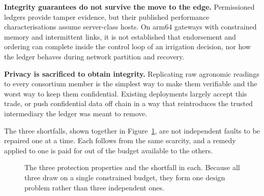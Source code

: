 \documentclass[12pt,a4paper,oneside]{book}
\begin{document}
\textbf{Integrity guarantees do not survive the move to the edge.} Permissioned
ledgers provide tamper evidence, but their published performance
characterisations assume server-class hosts. On \gls{arm64} gateways with
constrained memory and intermittent links, it is not established that
endorsement and ordering can complete inside the control loop of an irrigation
decision, nor how the ledger behaves during network partition and recovery.

\textbf{Privacy is sacrificed to obtain integrity.} Replicating raw agronomic
readings to every consortium member is the simplest way to make them verifiable
and the worst way to keep them confidential. Existing deployments largely accept
this trade, or push confidential data off chain in a way that reintroduces the
trusted intermediary the ledger was meant to remove.

The three shortfalls, shown together in Figure~\ref{fig:three-properties}, are
not independent faults to be repaired one at a time. Each follows from the same
scarcity, and a remedy applied to one is paid for out of the budget available
to the others.

\begin{figure}[htbp]
  \centering
  \caption{The three protection properties and the shortfall in each. Because
           all three draw on a single constrained budget, they form one design
           problem rather than three independent ones.}
  \label{fig:three-properties}
\end{figure}
\end{document}
